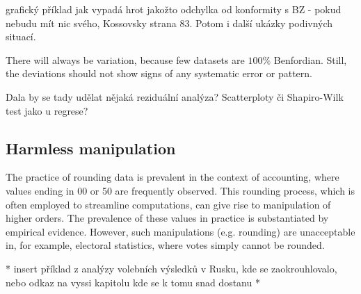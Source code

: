 \begin{koment}
    grafický příklad jak vypadá hrot jakožto odchylka od konformity s BZ - pokud nebudu mít nic svého, Kossovsky strana 83. Potom i další ukázky podivných situací.
\end{koment}

There will always be variation, because few datasets are $100\%$ Benfordian. Still, the deviations should not show signs of any systematic error or pattern. \cite{kossovsky2014benford} %


\begin{koment}
    Dala by se tady udělat nějaká reziduální analýza? Scatterploty či Shapiro-Wilk test jako u regrese?  
\end{koment}


\subsection{Harmless manipulation} 

The practice of rounding data is prevalent in the context of accounting, where values ending in 00 or 50 are frequently observed. This rounding process, which is often employed to streamline computations, can give rise to manipulation of higher orders. The prevalence of these values in practice is substantiated by empirical evidence. \cite{kossovsky2014benford} %
However, such manipulations (e.g. rounding) are unacceptable in, for example, electoral statistics, where votes simply cannot be rounded.


\begin{koment}
    * insert příklad z analýzy volebních výsledků v Rusku, kde se zaokrouhlovalo, nebo odkaz na vyssi kapitolu kde se k tomu snad dostanu * 
\end{koment}


